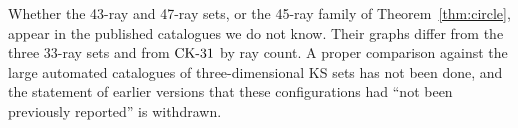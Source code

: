 Whether the 43-ray and 47-ray sets, or the 45-ray family of Theorem~\ref{thm:circle}, appear in
the published catalogues we do not know.  Their graphs differ from the three 33-ray sets and
from $\mathrm{CK}\text{-}31$ by ray count.  A proper comparison against the large automated
catalogues of three-dimensional KS sets has not been done, and the statement of earlier versions
that these configurations had ``not been previously reported'' is withdrawn.

